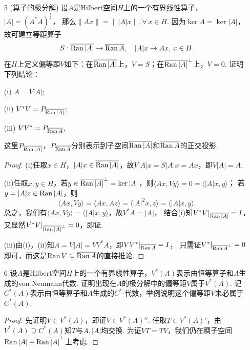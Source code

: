 \begin{enumerate}
\begin{proof}
    (ii) 对于任意的$ a\in \A $，要证明$ Q_{h}a=aQ_{h} $。
    由命题(b)，只需验证$ \overline{\A h} $ 是$ a $ 的约化子空间，这只需验证$\A h$是$a$的约化子空间。

    首先，$a\A\subseteq\A$说明$a(\A h)\subseteq\A h$；接着，$a^*\A\subseteq\A$说明
    $\langle -,\A h \rangle=0\Rightarrow\langle -,a^*\A h \rangle=0
    \Rightarrow\langle a-,\A h \rangle=0$，即$a(\A h)^\perp \subseteq (\A h)^\perp$。

    (iii) 由第8题直接得到。

    注：如果用约化子空间的等价定义$AM \subseteq M,A^*M \subseteq M$，上面的过程会更简短。
\end{proof}

\item[5] (算子的极分解) 设$A$是Hilbert空间$H$上的一个有界线性算子，$|A|=(A^*A)^{\frac{1}{2}}$，
那么$\|Ax\|=\||A|x\|,\forall\,x\in H$. 因为$\ker A=\ker|A|$，故可建立等距算子
\[S:\overline{\operatorname{Ran}|A|}\to\overline{\operatorname{Ran} A},\quad |A|x\to Ax,\,x\in H.\]
在$H$上定义偏等距$V$如下：在$\overline{\operatorname{Ran}|A|}$上，$V=S$；在$\overline{\operatorname{Ran}|A|}^\perp$上，$V=0$. 证明下列结论：

(i) $A=V|A|$;

(ii) $V^*V=P_{\overline{\operatorname{Ran}|A|}}$;

(iii) $VV^*=P_{\overline{\operatorname{Ran} A}}$,

这里$P_{\overline{\operatorname{Ran}|A|}}$，$P_{\overline{\operatorname{Ran} A}}$分别表示到子空间$\overline{\operatorname{Ran}|A|}$和$\overline{\operatorname{Ran} A}$的正交投影.
\begin{proof}
    (i)任取$x\in H$，$|A|x\in\overline{\operatorname{Ran}|A|}$，故$V|A|x=S|A|x=Ax$，即$V|A|=A$.

    (ii)任取$x,y\in H$，若$y\in\overline{\operatorname{Ran}|A|}^\perp=\ker|A|$，则$\langle Ax,Vy\rangle=0=\langle |A|x,y\rangle$；
    若$y=|A|z\in\operatorname{Ran}|A|$，则\[\langle Ax,Vy\rangle=\langle Ax,Az\rangle=\langle |A|^2x,z\rangle=\langle |A|x,y\rangle.\]
    总之，我们有$\langle Ax,Vy\rangle=\langle |A|x,y\rangle$，故$V^*A=|A|$，
    结合(i)知$V^*V|_{\overline{\operatorname{Ran}|A|}}=I$，又显然$V^*V|_{\overline{\operatorname{Ran}|A|}^\perp}=0$，即证.

    (iii)由(i)，(ii)知$A=V|A|=VV^*A$，即$VV^*|_{\overline{\operatorname{Ran} A}}=I$，
    只需证$V^*|_{\overline{\operatorname{Ran} A}^\perp}=0$即可，而这是$\operatorname{Ran} V\subseteq\overline{\operatorname{Ran} A}$的直接推论.
\end{proof}

\item[6] 设$A$是Hilbert空间$H$上的一个有界线性算子，$V^*(A)$表示由恒等算子和$A$生成的von Neumann代数.
证明出现在$A$的极分解中的偏等距$V$属于$V^*(A)$. 记$C^*(A)$表示由恒等算子和$A$生成的$C^*$-代数，举例说明这个偏等距$V$未必属于$C^*(A)$.
\begin{proof}
    先证明$V\in V^*(A)$，即证$V\in V^*(A)''$. 任取$T\in V^*(A)'$，由$V^*(A)\supseteq C^*(A)$知$T$与$A,|A|$均交换.
    为证$VT=TV$，我们仍在稠子空间$\operatorname{Ran}|A|+\overline{\operatorname{Ran}|A|}^\perp$上考虑.


\end{proof}
\end{enumerate}
